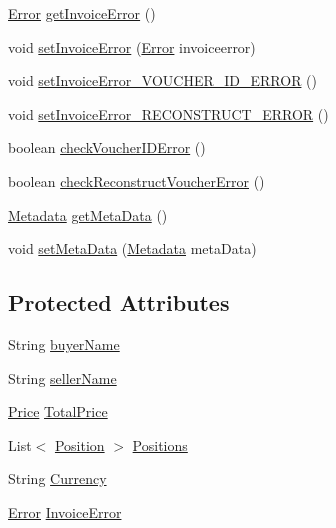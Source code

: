\begin{DoxyCompactItemize}
\item 
\hyperlink{enum_reduced_invoice_1_1_a_invoice_1_1_error}{Error} \hyperlink{class_reduced_invoice_1_1_a_invoice_ac6335f5b80ba3514a205e46c7170ae5c}{get\+Invoice\+Error} ()
\item 
void \hyperlink{class_reduced_invoice_1_1_a_invoice_a625c87b0ecdcbf896e66e4ad1fe31681}{set\+Invoice\+Error} (\hyperlink{enum_reduced_invoice_1_1_a_invoice_1_1_error}{Error} invoiceerror)
\item 
void \hyperlink{class_reduced_invoice_1_1_a_invoice_ae629ee52330ced3e2e3865159591b6bf}{set\+Invoice\+Error\+\_\+\+V\+O\+U\+C\+H\+E\+R\+\_\+\+I\+D\+\_\+\+E\+R\+R\+OR} ()
\item 
void \hyperlink{class_reduced_invoice_1_1_a_invoice_a84d5f81b1ad887324d38d2cd13e1fded}{set\+Invoice\+Error\+\_\+\+R\+E\+C\+O\+N\+S\+T\+R\+U\+C\+T\+\_\+\+E\+R\+R\+OR} ()
\item 
boolean \hyperlink{class_reduced_invoice_1_1_a_invoice_ad1cf29d7670fe6dc9410c41cb7c676de}{check\+Voucher\+I\+D\+Error} ()
\item 
boolean \hyperlink{class_reduced_invoice_1_1_a_invoice_a010f92b723472fce5b2885530e68329e}{check\+Reconstruct\+Voucher\+Error} ()
\item 
\hyperlink{class_reduced_invoice_1_1_metadata}{Metadata} \hyperlink{class_reduced_invoice_1_1_a_invoice_a27064d52b653a15a81485e72b54fd687}{get\+Meta\+Data} ()
\item 
void \hyperlink{class_reduced_invoice_1_1_a_invoice_a67f0ef58970f9aff38098d079e738596}{set\+Meta\+Data} (\hyperlink{class_reduced_invoice_1_1_metadata}{Metadata} meta\+Data)
\end{DoxyCompactItemize}
\subsection*{Protected Attributes}
\begin{DoxyCompactItemize}
\item 
String \hyperlink{class_reduced_invoice_1_1_a_invoice_ae75bdd20da8fa21dec01c2d032ac11c5}{buyer\+Name}
\item 
String \hyperlink{class_reduced_invoice_1_1_a_invoice_ae00a97e1c74841fe0b0b43fccd1da24d}{seller\+Name}
\item 
\hyperlink{class_reduced_invoice_1_1_price}{Price} \hyperlink{class_reduced_invoice_1_1_a_invoice_a72b831e7ee0b4501fc949f61aecdd498}{Total\+Price}
\item 
List$<$ \hyperlink{class_reduced_invoice_1_1_position}{Position} $>$ \hyperlink{class_reduced_invoice_1_1_a_invoice_a5b51f1865386bd021580507c7133f69a}{Positions}
\item 
String \hyperlink{class_reduced_invoice_1_1_a_invoice_a6b6ef26c85bc07f70cb7b4c8eb057fe8}{Currency}
\item 
\hyperlink{enum_reduced_invoice_1_1_a_invoice_1_1_error}{Error} \hyperlink{class_reduced_invoice_1_1_a_invoice_a3ef6a3a4efa7e9b652f5399bc76e017a}{Invoice\+Error}
\end{DoxyCompactItemize}



